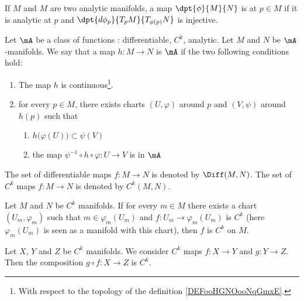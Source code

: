 \begin{definition}      \label{DEFooMELXooEkEnwz}
	If $M$ and $M$ are two analytic manifolds, a map $\dpt{\phi}{M}{N}$ is \label{PgDefRegular} at $p\in M$ if it is analytic at $p$ and $\dpt{d\phi_p}{T_pM}{T_{\phi(p)}N}$ is injective.
\end{definition}

\begin{definition}        \label{DEFooFNTHooEwsqXB}
	Let \( \mA\) be a class of functions : differentiable, \( C^k\), analytic. Let \( M\) and \( N\) be \( \mA\)-manifolds. We say that a map \( h\colon M\to N\) is \( \mA\) if the two following conditions hold:
	\begin{enumerate}
		\item
		      The map \( h\) is continuous\footnote{With respect to the topology of the definition \ref{DEFooHGNOooNqGmxE}.}.
		\item
		      for every \( p\in M\), there exists charts \( (U,\varphi)\) around \( p\) and \( (V,\psi)\) around \( h(p)\) such that
		      \begin{enumerate}
			      \item
			            \( h\big( \varphi(U) \big)\subset\psi(V)\)
			      \item       \label{SUBITEMooXQFUooRxMVnw}
			            the map \( \psi^{-1}\circ h\circ\varphi\colon U \to V \) is in \( \mA\)
		      \end{enumerate}
	\end{enumerate}
	The set of differentiable maps \(f \colon M\to N  \) is denoted by \( \Diff(M,N)\). The set of \( C^k\) maps \(f \colon M\to N  \) is denoted by \(C^k(M,N)\).
\end{definition}

\begin{proposition}		\label{PROPooGQVUooWmPmQV}
	Let \( M\) and \( N\) be \( C^k\) manifolds. If for every \( m\in M\) there exists a chart \( (U_m,\varphi_m)\) such that \( m\in \varphi_m(U_m)\) and  \(f \colon U_m\to \varphi_m(U_m)  \) is \( C^k\) (here \( \varphi_m(U_m)\) is seen as a manifold with this chart), then \( f\) is \( C^k\) on \( M\).
\end{proposition}

\begin{proposition}		\label{PROPooODGHooFYluSu}
	Let \( X\), \( Y\) and \( Z\) be \( C^k\) manifolds. We consider \( C^k\) maps \(f \colon X\to Y  \) and \(g \colon Y\to Z  \). Then the composition \(g\circ f \colon X\to Z  \) is \( C^k\).
\end{proposition}

